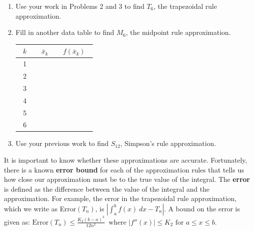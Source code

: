 \documentclass[12pt]{article}
\begin{document}
\begin{enumerate}
\bigskip

\bigskip

\item Use your work in Problems 2 and 3 to find $T_6$, the trapezoidal rule approximation.

\bigskip

\bigskip

\item Fill in another data table to find $M_6$, the midpoint rule approximation.

\begin{tabular}{|c|r|r|}
\hline  
~$k$~ & ~$\bar{x}_k$~ & ~$f(\bar{x}_k)$~ \\
\hline
1 & & \\
\hline
2 & & \\
\hline
3 & & \\
\hline
4 & & \\
\hline
5 & & \\
\hline
6 & & \\
\hline
\end{tabular}

\item Use your previous work to find $S_{12}$, Simpson's rule approximation.
\end{enumerate}
\pagebreak


It is important to know whether these approximations are accurate. Fortunately, there is a known \textbf{error bound} for each of the approximation rules that tells us how close our approximation must be to the true value of the integral. The \textbf{error} is defined as the difference between the value of the integral and the approximation. For example, the error in the trapezoidal rule approximation, which we write as Error$(T_n)$, is $\left|\int_a^b f(x) \ dx - T_n\right|$. A bound on the error is given as:
$\mbox{Error}(T_n)\leq \displaystyle\frac{K_2 (b-a)^3}{12 n^2} \ \mbox{   where } |f''(x)|\leq K_2 \mbox{ for } a\leq x\leq b$.

\end{document}
